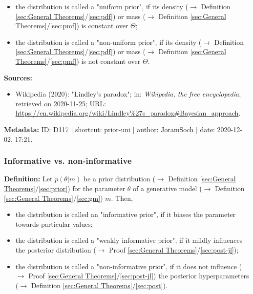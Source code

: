\documentclass[a4paper,12pt,twoside]{book}
\begin{document}
\begin{itemize}

\item the distribution is called a "uniform prior", if its density ($\rightarrow$ Definition \ref{sec:General Theorems}/\ref{sec:pdf}) or mass ($\rightarrow$ Definition \ref{sec:General Theorems}/\ref{sec:pmf}) is constant over $\Theta$;

\item the distribution is called a "non-uniform prior", if its density ($\rightarrow$ Definition \ref{sec:General Theorems}/\ref{sec:pdf}) or mass ($\rightarrow$ Definition \ref{sec:General Theorems}/\ref{sec:pmf}) is not constant over $\Theta$.

\end{itemize}


\vspace{1em}
\textbf{Sources:}
\begin{itemize}
\item Wikipedia (2020): "Lindley's paradox"; in: \textit{Wikipedia, the free encyclopedia}, retrieved on 2020-11-25; URL: \url{https://en.wikipedia.org/wiki/Lindley%27s_paradox#Bayesian_approach}.
\end{itemize}


\vspace{1em}
\textbf{Metadata:} ID: D117 | shortcut: prior-uni | author: JoramSoch | date: 2020-12-02, 17:21.
\vspace{1em}



\subsubsection[\textit{Informative vs. non-informative}]{Informative vs. non-informative} \label{sec:prior-inf}
\setcounter{equation}{0}

\textbf{Definition:} Let $p(\theta \vert m)$ be a prior distribution ($\rightarrow$ Definition \ref{sec:General Theorems}/\ref{sec:prior}) for the parameter $\theta$ of a generative model ($\rightarrow$ Definition \ref{sec:General Theorems}/\ref{sec:gm}) $m$. Then,

\begin{itemize}

\item the distribution is called an "informative prior", if it biases the parameter towards particular values;

\item the distribution is called a "weakly informative prior", if it mildly influences the posterior distribution ($\rightarrow$ Proof \ref{sec:General Theorems}/\ref{sec:post-jl});

\item the distribution is called a "non-informative prior", if it does not influence ($\rightarrow$ Proof \ref{sec:General Theorems}/\ref{sec:post-jl}) the posterior hyperparameters ($\rightarrow$ Definition \ref{sec:General Theorems}/\ref{sec:post}).

\end{itemize}
\end{document}
